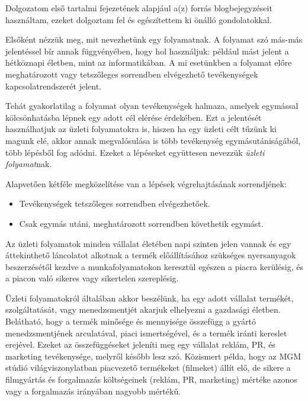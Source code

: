 

Dolgozatom első tartalmi fejezetének alapjául a(z) \cite{xflower} forrás blogbejegyzéseit használtam, ezeket dolgoztam fel és egészítettem ki önálló gondolatokkal.


Elsőként nézzük meg, mit nevezhetünk egy folyamatnak. A folyamat szó más-más jelentéssel bír annak függvényében, hogy hol használjuk: például mást jelent a hétköznapi életben, mint az informatikában. A mi esetünkben a folyamat előre meghatározott vagy tetszőleges sorrendben elvégezhető tevékenységek kapcsolatrendszerét jelent.

Tehát gyakorlatilag a folyamat olyan tevékenységek halmaza, amelyek egymással kölcsönhatásba lépnek egy adott cél elérése érdekében. Ezt a jelentését használhatjuk az üzleti folyamatokra is, hiszen ha egy üzleti célt tűzünk ki magunk elé, akkor annak megvalósulása is több tevékenység egymásutániságából, több lépésből fog adódni. Ezeket a lépéseket együttesen nevezzük \textit{üzleti folyamat}nak.

Alapvetően kétféle megközelítése van a lépések végrehajtásának sorrendjének:

\begin{itemize}
\item Tevékenységek tetszőleges sorrendben elvégezhetőek.
\item Csak egymás utáni, meghatározott sorrendben követhetik egymást.
\end{itemize}

Az üzleti folyamatok minden vállalat életében napi szinten jelen vannak és egy áttekinthető láncolatot alkotnak a termék előállításához szükséges nyersanyagok beszerzésétől kezdve a munkafolyamatokon keresztül egészen a piacra kerülésig, és a piacon való sikeres vagy sikertelen szereplésig.

Üzleti folyamatokról általában akkor beszélünk, ha egy adott vállalat termékét, szolgáltatását, vagy menedzsmentjét akarjuk elhelyezni a gazdasági életben. Belátható, hogy a termék minősége és mennyisége összefügg a gyártó menedzsmentjének arculatával, piaci ismertségével, és a termék iránti kereslet erejével. Ezeket az összefüggéseket jeleníti meg egy vállalat reklám, PR, és marketing tevékenysége, melyről később lesz szó. Közismert példa, hogy az MGM stúdió világviszonylatban piacvezető termékeket (filmeket) állít elő, de sikere a filmgyártás és forgalmazás költségeinek (reklám, PR, marketing) mértéke azonos vagy a forgalmazás irányában nagyobb mértékű.

